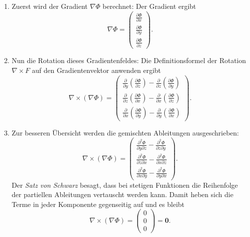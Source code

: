\begin{enumerate}
    \item Zuerst wird der Gradient $\nabla\Phi$ berechnet:
    Der Gradient ergibt
    $$
    \nabla \Phi =
    \begin{pmatrix}
        \frac{\partial \Phi}{\partial x} \\
        \frac{\partial \Phi}{\partial y} \\
        \frac{\partial \Phi}{\partial z}
    \end{pmatrix}.
    $$

    \item Nun die Rotation dieses Gradientenfeldes: Die Definitionsformel der Rotation $\nabla \times F$ auf den Gradientenvektor anwenden ergibt
    $$
    \nabla \times (\nabla \Phi) =
    \begin{pmatrix}
        \frac{\partial}{\partial y}\left(\frac{\partial \Phi}{\partial z}\right) - \frac{\partial}{\partial z}\left(\frac{\partial \Phi}{\partial y}\right) \\
        \frac{\partial}{\partial z}\left(\frac{\partial \Phi}{\partial x}\right) - \frac{\partial}{\partial x}\left(\frac{\partial \Phi}{\partial z}\right) \\
        \frac{\partial}{\partial x}\left(\frac{\partial \Phi}{\partial y}\right) - \frac{\partial}{\partial y}\left(\frac{\partial \Phi}{\partial x}\right)
    \end{pmatrix}.
    $$

    \item %
    
    Zur besseren Übersicht werden die gemischten Ableitungen ausgeschrieben:
    $$
    \nabla \times (\nabla \Phi) =
    \begin{pmatrix}
        \frac{\partial^2 \Phi}{\partial y \partial z} - \frac{\partial^2 \Phi}{\partial z \partial y} \\
        \frac{\partial^2 \Phi}{\partial z \partial x} - \frac{\partial^2 \Phi}{\partial x \partial z} \\
        \frac{\partial^2 \Phi}{\partial x \partial y} - \frac{\partial^2 \Phi}{\partial y \partial x}
    \end{pmatrix}.
    $$
    Der \emph{Satz von Schwarz} besagt, dass bei stetigen Funktionen die Reihenfolge der partiellen Ableitungen vertauscht werden kann. Damit heben sich die Terme in jeder Komponente gegenseitig auf und es bleibt
    $$
    \nabla \times (\nabla \Phi)  =
    \begin{pmatrix}
        0 \\
        0 \\
        0
    \end{pmatrix} = \boldsymbol{0}.
    $$
\end{enumerate}

